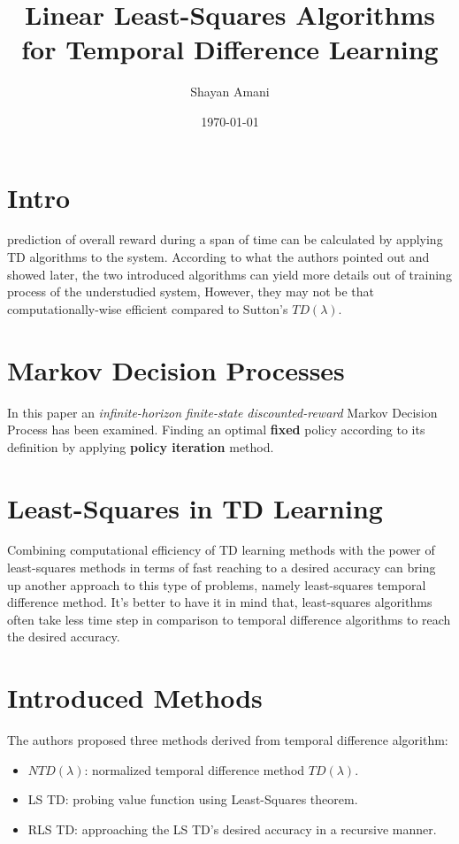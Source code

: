 \documentclass[a4paper,12pt]{article}
\title{Linear Least-Squares Algorithms for Temporal Difference Learning}
\author{Shayan Amani}
\date{\today}
\begin{document}
\maketitle

\section{Intro}
prediction of overall reward during a span of time can be calculated by applying TD algorithms to the system. According to what the authors pointed out and showed later, the two introduced algorithms can yield more details out of training process of the understudied system, However, they may not be that computationally-wise efficient compared to Sutton's $TD(\lambda)$. 

\section{Markov Decision Processes}
In this paper an \textit{infinite-horizon} \textit{finite-state} \textit{discounted-reward} Markov Decision Process has been examined. Finding an optimal \textbf{fixed} policy according to its definition by applying\textbf{ policy iteration} method.

\section{Least-Squares in TD Learning}
Combining computational efficiency of TD learning methods with the power of least-squares methods in terms of fast reaching to a desired accuracy can bring up another approach to this type of problems, namely least-squares temporal difference method. It's better to have it in mind that, least-squares algorithms often take less time step in comparison to temporal difference algorithms to reach the desired accuracy.

\section{Introduced Methods}
The authors proposed three methods derived from temporal difference algorithm:
\begin{itemize}
    \item $NTD(\lambda)$: normalized temporal difference method $TD(\lambda)$.
    \item LS TD: probing value function using Least-Squares theorem.
    \item RLS TD: approaching the LS TD's desired accuracy in a recursive manner.
\end{itemize}
\end{document}
